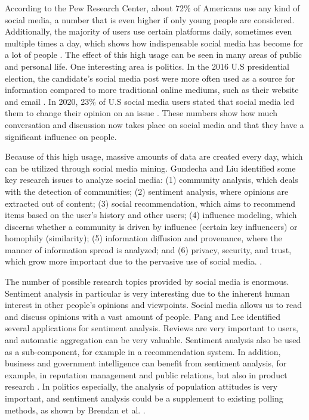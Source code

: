 According to the Pew Research Center, about 72\% of Americans use any kind of social media, a number that is even higher if only young people are considered. Additionally, the majority of users use certain platforms daily, sometimes even multiple times a day, which shows how indispensable social media has become for a lot of people \cite{pew:socialmedia}. The effect of this high usage can be seen in many areas of public and personal life. One interesting area is politics. In the 2016 U.S presidential election, the candidate's social media post were more often used as a source for information compared to more traditional online mediums, such as their website and email \cite{pew:2016source}. In 2020, 23\% of U.S social media users stated that social media led them to change their opinion on an issue \cite{pew:2020influence}. These numbers show how much conversation and discussion now takes place on social media and that they have a significant influence on people.

Because of this high usage, massive amounts of data are created every day, which can be utilized through social media mining. Gundecha and Liu identified some key research issues to analyze social media: (1) community analysis, which deals with the detection of communities; (2) sentiment analysis, where opinions are extracted out of content; (3) social recommendation, which aims to recommend items based on the user's history and other users; (4) influence modeling, which discerns whether a community is driven by influence (certain key influencers) or homophily (similarity); (5) information diffusion and provenance, where the manner of information spread is analyzed; and (6) privacy, security, and trust, which grow more important due to the pervasive use of social media. \cite{Gundecha2012MiningSM}.

The number of possible research topics provided by social media is enormous. Sentiment analysis in particular is very interesting due to the inherent human interest in other people's opinions and viewpoints. Social media allows us to read and discuss opinions with a vast amount of people. Pang and Lee identified several applications for sentiment analysis. Reviews are very important to users, and automatic aggregation can be very valuable. Sentiment analysis also be used as a sub-component, for example in a recommendation system. In addition, business and government intelligence can benefit from sentiment analysis, for example, in reputation management and public relations, but also in product research \cite{pang-etal-2002-thumbs}. In politics especially, the analysis of population attitudes is very important, and sentiment analysis could be a supplement to existing polling methods, as shown by Brendan et al. \cite{polls}. 

